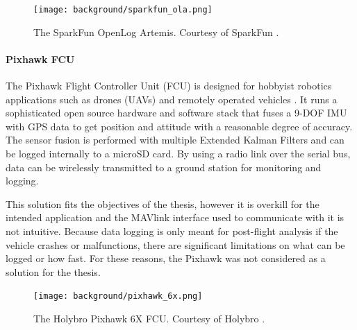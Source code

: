 \begin{figure}
    \centering
    \caption[SparkFun OpenLog Artemis]{The SparkFun OpenLog Artemis.
    Courtesy of SparkFun \cite{SparkFun}.}
    \texttt{[image: background/sparkfun\_ola.png]}
\end{figure}

\paragraph*{Pixhawk FCU} The Pixhawk Flight Controller Unit (FCU) is designed for hobbyist robotics applications such as drones (UAVs) and remotely operated vehicles \cite{HolyBro}.
It runs a sophisticated open source hardware and software stack that fuses a 9-DOF IMU with GPS data to get position and attitude with a reasonable degree of accuracy.
The sensor fusion is performed with multiple Extended Kalman Filters and can be logged internally to a microSD card.
By using a radio link over the serial bus, data can be wirelessly transmitted to a ground station for monitoring and logging.

This solution fits the objectives of the thesis, however it is overkill for the intended application and the MAVlink interface used to communicate with it is not intuitive.
Because data logging is only meant for post-flight analysis if the vehicle crashes or malfunctions, there are significant limitations on what can be logged or how fast.
For these reasons, the Pixhawk was not considered as a solution for the thesis.

\begin{figure}
    \centering
    \caption[Holybro Pixhawk 6X]{The Holybro Pixhawk 6X FCU.
    Courtesy of Holybro \cite{HolyBro}.}
    \texttt{[image: background/pixhawk\_6x.png]}
\end{figure}